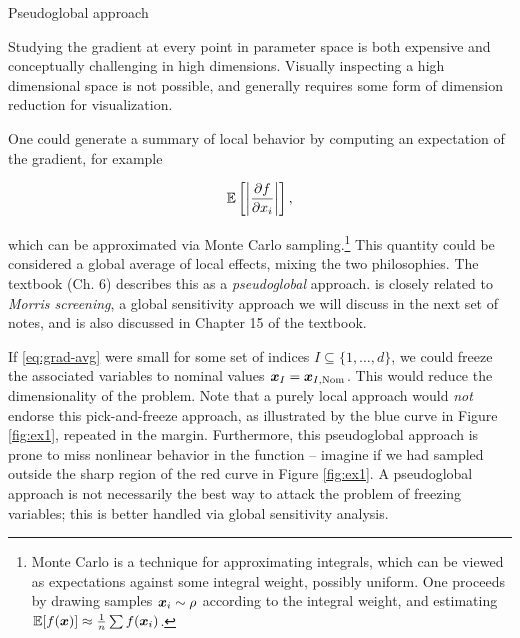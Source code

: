 \documentclass[../primer.tex]{subfiles}
\begin{document}
Pseudoglobal approach

Studying the gradient at every point in parameter space is both expensive and
conceptually challenging in high dimensions. Visually inspecting a high
dimensional space is not possible, and generally requires some form of dimension
reduction for visualization.

One could generate a summary of local behavior by computing an expectation of
the gradient, for example

\begin{equation}\label{eq:grad-avg}
  \mathbb{E}\left[\left|\frac{\partial f}{\partial x_i}\right|\right],
\end{equation}

\noindent which can be approximated via Monte Carlo sampling.\footnote{Monte Carlo is
a technique for approximating integrals, which can be viewed as expectations
against some integral weight, possibly uniform. One proceeds by drawing samples
\(\boldsymbol{x}_i\sim\rho\) according to the integral weight, and estimating
\(\mathbb{E}[f(\boldsymbol{x})]\approx\frac{1}{n}\sum f(\boldsymbol{x}_i)\).} This quantity could be considered
a global average of local effects, mixing the two philosophies. The textbook
(Ch. 6) describes this as a \emph{pseudoglobal} approach.  is
closely related to \emph{Morris screening}, a global sensitivity approach we will
discuss in the next set of notes, and is also discussed in Chapter 15 of the
textbook.\cite{smith2013uncertainty}


If \eqref{eq:grad-avg} were small for some set of indices
\(I\subseteq\{1,\dots,d\}\), we could freeze the associated variables to nominal
values \(\boldsymbol{x}_{I}=\boldsymbol{x}_{I,\text{Nom}}\). This would reduce the dimensionality of the
problem. Note that a purely local approach would \emph{not} endorse this
pick-and-freeze approach, as illustrated by the blue curve in Figure
\ref{fig:ex1}, repeated in the margin. Furthermore, this pseudoglobal approach
is prone to miss nonlinear behavior in the function -- imagine if we had sampled
outside the sharp region of the red curve in Figure \ref{fig:ex1}. A
pseudoglobal approach is not necessarily the best way to attack the problem of
freezing variables; this is better handled via global sensitivity analysis.
\end{document}
